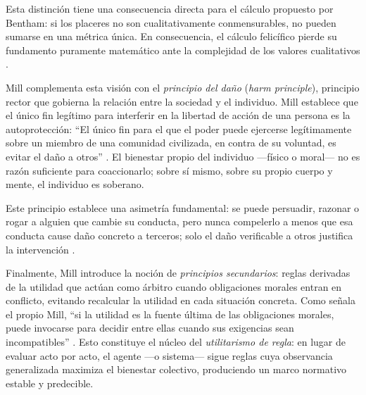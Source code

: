 Esta distinción tiene una consecuencia directa para el cálculo propuesto por Bentham: si los placeres no son cualitativamente conmensurables, no pueden sumarse en una métrica única. En consecuencia, el cálculo felicífico pierde su fundamento puramente matemático ante la complejidad de los valores cualitativos \citep{mill2014utilitarismo}.

\medskip

Mill complementa esta visión con el \textit{principio del daño} (\textit{harm principle}), principio rector que gobierna la relación entre la sociedad y el individuo. Mill establece que el único fin legítimo para interferir en la libertad de acción de una persona es la autoprotección: ``El único fin para el que el poder puede ejercerse legítimamente sobre un miembro de una comunidad civilizada, en contra de su voluntad, es evitar el daño a otros'' \citep{mill1863utilitarianism}. El bienestar propio del individuo ---físico o moral--- no es razón suficiente para coaccionarlo; sobre sí mismo, sobre su propio cuerpo y mente, el individuo es soberano.

\medskip

Este principio establece una asimetría fundamental: se puede persuadir, razonar o rogar a alguien que cambie su conducta, pero nunca compelerlo a menos que esa conducta cause daño concreto a terceros; solo el daño verificable a otros justifica la intervención \citep{mill2014utilitarismo}.

\medskip

Finalmente, Mill introduce la noción de \textit{principios secundarios}: reglas derivadas de la utilidad que actúan como árbitro cuando obligaciones morales entran en conflicto, evitando recalcular la utilidad en cada situación concreta. Como señala el propio Mill, ``si la utilidad es la fuente última de las obligaciones morales, puede invocarse para decidir entre ellas cuando sus exigencias sean incompatibles'' \citep{mill1863utilitarianism}. Esto constituye el núcleo del \textit{utilitarismo de regla}: en lugar de evaluar acto por acto, el agente ---o sistema--- sigue reglas cuya observancia generalizada maximiza el bienestar colectivo, produciendo un marco normativo estable y predecible.
